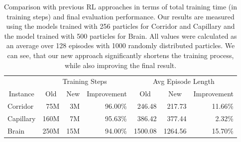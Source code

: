 \begin{table}[htp]
    \begin{center}
        \begin{tabular}{lrrrrrr}
            \toprule
            & \multicolumn{3}{c}{Training Steps} & \multicolumn{3}{c}{Avg Episode Length} \\
            \cmidrule(lr){2-4} \cmidrule(lr){5-7}
            \multicolumn{1}{c}{Instance} & \multicolumn{1}{c}{Old} & \multicolumn{1}{c}{New} & \multicolumn{1}{c}{Improvement} & \multicolumn{1}{c}{Old} & \multicolumn{1}{c}{New} & \multicolumn{1}{c}{Improvement} \\
            \midrule
            Corridor & 75M & 3M & 96.00\% & 246.48 & 217.73 & 11.66\% \\
            Capillary & 160M & 7M & 95.63\% & 386.42 & 377.44 & 2.32\% \\
            Brain & 250M & 15M & 94.00\% & 1500.08 & 1264.56 & 15.70\% \\
            \bottomrule
        \end{tabular}

    \end{center}
    \caption[Comparison with Previous RL Approaches]{Comparison with previous RL approaches in terms of total training time (in training steps) and final evaluation performance. Our results are measured using the models trained with 256 particles for Corridor and Capillary and the model trained with 500 particles for Brain. All values were calculated as an average over 128 episodes with 1000 randomly distributed particles. We can see, that our new approach significantly shortens the training process, while also improving the final result.} \label{tab:Eval/PreviousRLApproach}
\end{table}

